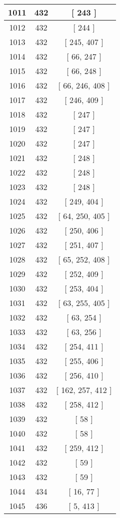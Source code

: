 \begin{center}
\begin{longtable}[H]{|| c c c ||}
\hline
1011 & 432 & [ 243 ] \\ 
\hline
1012 & 432 & [ 244 ] \\ 
\hline
1013 & 432 & [ 245, 407 ] \\ 
\hline
1014 & 432 & [ 66, 247 ] \\ 
\hline
1015 & 432 & [ 66, 248 ] \\ 
\hline
1016 & 432 & [ 66, 246, 408 ] \\ 
\hline
1017 & 432 & [ 246, 409 ] \\ 
\hline
1018 & 432 & [ 247 ] \\ 
\hline
1019 & 432 & [ 247 ] \\ 
\hline
1020 & 432 & [ 247 ] \\ 
\hline
1021 & 432 & [ 248 ] \\ 
\hline
1022 & 432 & [ 248 ] \\ 
\hline
1023 & 432 & [ 248 ] \\ 
\hline
1024 & 432 & [ 249, 404 ] \\ 
\hline
1025 & 432 & [ 64, 250, 405 ] \\ 
\hline
1026 & 432 & [ 250, 406 ] \\ 
\hline
1027 & 432 & [ 251, 407 ] \\ 
\hline
1028 & 432 & [ 65, 252, 408 ] \\ 
\hline
1029 & 432 & [ 252, 409 ] \\ 
\hline
1030 & 432 & [ 253, 404 ] \\ 
\hline
1031 & 432 & [ 63, 255, 405 ] \\ 
\hline
1032 & 432 & [ 63, 254 ] \\ 
\hline
1033 & 432 & [ 63, 256 ] \\ 
\hline
1034 & 432 & [ 254, 411 ] \\ 
\hline
1035 & 432 & [ 255, 406 ] \\ 
\hline
1036 & 432 & [ 256, 410 ] \\ 
\hline
1037 & 432 & [ 162, 257, 412 ] \\ 
\hline
1038 & 432 & [ 258, 412 ] \\ 
\hline
1039 & 432 & [ 58 ] \\ 
\hline
1040 & 432 & [ 58 ] \\ 
\hline
1041 & 432 & [ 259, 412 ] \\ 
\hline
1042 & 432 & [ 59 ] \\ 
\hline
1043 & 432 & [ 59 ] \\ 
\hline
1044 & 434 & [ 16, 77 ] \\ 
\hline
1045 & 436 & [ 5, 413 ] \\ 

\end{longtable}
\end{center}
